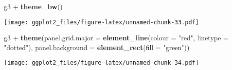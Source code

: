 \documentclass[]{article}
\newenvironment{Shaded}{\begin{snugshade}}{\end{snugshade}}
\newcommand{\KeywordTok}[1]{\textcolor[rgb]{0.13,0.29,0.53}{\textbf{{#1}}}}
\newcommand{\DataTypeTok}[1]{\textcolor[rgb]{0.13,0.29,0.53}{{#1}}}
\newcommand{\StringTok}[1]{\textcolor[rgb]{0.31,0.60,0.02}{{#1}}}
\newcommand{\NormalTok}[1]{{#1}}
\begin{document}
\begin{Shaded}
\begin{Highlighting}[]
\NormalTok{g3 +}\StringTok{ }\KeywordTok{theme_bw}\NormalTok{()}
\end{Highlighting}
\end{Shaded}

\texttt{[image: ggplot2\_files/figure-latex/unnamed-chunk-33.pdf]}

\newpage

\begin{Shaded}
\begin{Highlighting}[]
\NormalTok{g3 +}\StringTok{ }\KeywordTok{theme}\NormalTok{(}\DataTypeTok{panel.grid.major =} \KeywordTok{element_line}\NormalTok{(}\DataTypeTok{colour =} \StringTok{"red"}\NormalTok{, }\DataTypeTok{linetype =} \StringTok{"dotted"}\NormalTok{), }\DataTypeTok{panel.background =} \KeywordTok{element_rect}\NormalTok{(}\DataTypeTok{fill =} \StringTok{"green"}\NormalTok{))}
\end{Highlighting}
\end{Shaded}

\texttt{[image: ggplot2\_files/figure-latex/unnamed-chunk-34.pdf]}
\end{document}
